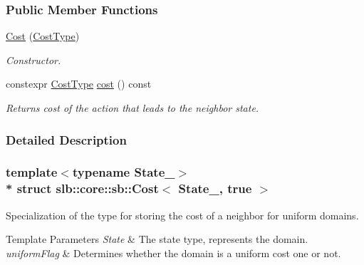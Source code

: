\subsubsection*{Public Member Functions}
\begin{DoxyCompactItemize}
\item 
\hyperlink{structslb_1_1core_1_1sb_1_1Cost_3_01State___00_01true_01_4_a1bbfc5102b06386aaed54c23fcf65e50}{Cost} (\hyperlink{structslb_1_1core_1_1sb_1_1Cost_3_01State___00_01true_01_4_a13c4b693ea73bc79237bc51ec08f125c}{Cost\+Type})\hypertarget{structslb_1_1core_1_1sb_1_1Cost_3_01State___00_01true_01_4_a1bbfc5102b06386aaed54c23fcf65e50}{}\label{structslb_1_1core_1_1sb_1_1Cost_3_01State___00_01true_01_4_a1bbfc5102b06386aaed54c23fcf65e50}

\begin{DoxyCompactList}\small\item\em Constructor. \end{DoxyCompactList}\item 
constexpr \hyperlink{structslb_1_1core_1_1sb_1_1Cost_3_01State___00_01true_01_4_a13c4b693ea73bc79237bc51ec08f125c}{Cost\+Type} \hyperlink{structslb_1_1core_1_1sb_1_1Cost_3_01State___00_01true_01_4_a747e3d089f0b93d3d74d86d7212715f8}{cost} () const 
\begin{DoxyCompactList}\small\item\em Returns cost of the action that leads to the neighbor state. \end{DoxyCompactList}\end{DoxyCompactItemize}


\subsubsection{Detailed Description}
\subsubsection*{template$<$typename State\+\_\+$>$\\*
struct slb\+::core\+::sb\+::\+Cost$<$ State\+\_\+, true $>$}

Specialization of the type for storing the cost of a neighbor for uniform domains. 


\begin{DoxyTemplParams}{Template Parameters}
{\em State} & The state type, represents the domain. \\
\hline
{\em uniform\+Flag} & Determines whether the domain is a uniform cost one or not. \\
\hline
\end{DoxyTemplParams}


